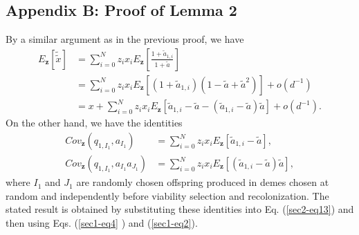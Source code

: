 \documentclass[11pt]{article}
\begin{document}
\subsection*{Appendix B: Proof of Lemma 2  }
By a similar argument as in the previous proof, we have
\begin{equation}\label{sec2-eq13}
\begin{split}
E_{\mathbf{z}}[\tilde{\tilde{x}}]&=\sum_{i=0}^{N}z_ix_iE_{\mathbf{z}}\left[\frac{1+\tilde{a}_{1,i}}{1+\tilde{a}}\right]\\
&=\sum_{i=0}^{N}z_ix_iE_{\mathbf{z}}\left[\left(1+\tilde{a}_{1,i}\right)\left(1-\tilde{a}+\tilde{a}^2\right)\right]+o(d^{-1})\\
&=x+\sum_{i=0}^{N}z_ix_iE_{\mathbf{z}}\left[\tilde{a}_{1,i}-\tilde{a}-(\tilde{a}_{1,i}-\tilde{a})\tilde{a}\right]+o(d^{-1}).
\end{split}
\end{equation}
On the other hand, we have the identities
\begin{subequations}\label{sec2-eq14}
\begin{align}
Cov_{\mathbf{z}}(q_{1,I_1},a_{I_1})&=\sum_{i=0}^{N}z_ix_iE_{\mathbf{z}}\left[\tilde{a}_{1,i}-\tilde{a}\right],\\
Cov_{\mathbf{z}}(q_{1,I_1},a_{I_1}a_{J_1})&=\sum_{i=0}^{N}z_ix_iE_{\mathbf{z}}\left[(\tilde{a}_{1,i}-\tilde{a})\tilde{a}\right],
\end{align}
\end{subequations}
where $I_1$ and $J_1$ are randomly chosen offspring produced in demes chosen at random and independently before viability selection and recolonization. The stated result  is obtained by substituting these identities into Eq. (\ref{sec2-eq13}) and then using Eqs. (\ref{sec1-eq4} ) and (\ref{sec1-eq2}).
\end{document}
